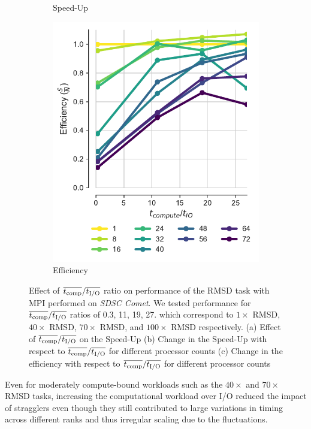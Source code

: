 \begin{figure}[ht!]
\begin{subfigure}{.3\textwidth}
  \caption{Speed-Up}
  \label{fig:S2_tcomp_tIO_effect}
\end{subfigure}
\hfill
\begin{subfigure}{.3\textwidth}
  \includegraphics[width=\linewidth]{figures/Compute_to_IO_ratio_on_performance_2d_3_v17.pdf}
  \caption{Efficiency}
  \label{fig:E_tcomp_tIO_effect}
\end{subfigure}
%
\caption{Effect of $\overline{{t}_{\text{comp}}}/\overline{{t}_{\text{I/O}}}$ ratio on performance of the RMSD task with MPI performed on \emph{SDSC Comet}. We tested performance for $\overline{{t}_{\text{comp}}}/\overline{{t}_{\text{I/O}}}$ ratios of 0.3, 11, 19, 27.
which correspond to $1\times$ RMSD, $40\times$ RMSD, $70\times$ RMSD, and $100\times$ RMSD respectively. (a) Effect of $\overline{{t}_{\text{comp}}}/\overline{{t}_{\text{I/O}}}$ on the Speed-Up
(b) Change in the Speed-Up with respect to $\overline{{t}_{\text{comp}}}/\overline{{t}_{\text{I/O}}}$ for different processor counts (c) Change in the efficiency with respect to $\overline{{t}_{\text{comp}}}/\overline{{t}_{\text{I/O}}}$ for different processor counts}
\label{fig:tcomp_tIO_effect}
\end{figure}

Even for moderately compute-bound workloads such as the $40\times$ and $70\times$ RMSD tasks, increasing the computational workload over I/O reduced the impact of stragglers even though they still contributed to large variations in timing across different ranks and thus irregular scaling due to the fluctuations.

